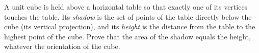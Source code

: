 A unit cube is held above a horizontal table so that exactly one of its vertices touches the table. Its \emph{shadow} is the set of points of the table directly below the cube (its vertical projection), and its \emph{height} is the distance from the table to the highest point of the cube. Prove that the area of the shadow equals the height, whatever the orientation of the cube.
